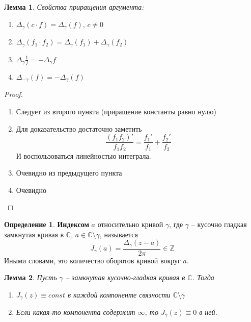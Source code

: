 \documentclass[a4paper,12pt]{article}
\theoremstyle{plain}
\newtheorem{lemma}{Лемма}[section]
\theoremstyle{definition}
\newtheorem{definition}{Определение}[section]
\theoremstyle{remark}
\begin{document}
\begin{lemma}
	Свойства приращения аргумента:
	\begin{enumerate}
		\item $\Delta_\gamma(c\cdot f) = \Delta_\gamma(f),\, c \neq 0$
		\item $\Delta_\gamma(f_1\cdot f_2) = \Delta_\gamma(f_1) + \Delta_\gamma(f_2)$
		\item $\Delta_\gamma\frac{1}{f} = -\Delta_\gamma f$
		\item $\Delta_{-\gamma}(f) = -\Delta_\gamma(f)$
	\end{enumerate}
\end{lemma}

\begin{proof}
	\begin{enumerate}
		\item Следует из второго пункта (приращение константы равно нулю)
		\item Для доказательство достаточно заметить
		      \[
			      \frac{(f_1f_2)'}{f_1f_2} = \frac{f_1'}{f_1} +
			      \frac{f_2'}{f_2}
		      \]
		      И воспользоваться линейностью интеграла.
		\item Очевидно из предыдущего пункта
		\item Очевидно
	\end{enumerate}
\end{proof}

\begin{definition}
	\textbf{Индексом} $a$ относительно кривой $\gamma$, где $\gamma$ -- кусочно гладкая замкнутая кривая в $\mathbb{C},\, a \in \mathbb{C} \setminus \gamma$, называется
	\[
		J_\gamma(a) = \frac{\Delta_\gamma(z - a)}{2\pi} \in \mathbb{Z}
	\]
	Иными словами, это количество оборотов кривой вокруг $a$.
\end{definition}

\begin{lemma}
	Пусть $\gamma$ -- замкнутая кусочно-гладкая кривая в $\mathbb{C}$. Тогда
	\begin{enumerate}
		\item $J_\gamma(z) \equiv const$ в каждой компоненте связности $\mathbb{C}\setminus\gamma$
		\item Если какая-то компонента содержит $\infty$, то $J_\gamma(z) \equiv 0$ в ней.
	\end{enumerate}
\end{lemma}
\end{document}
